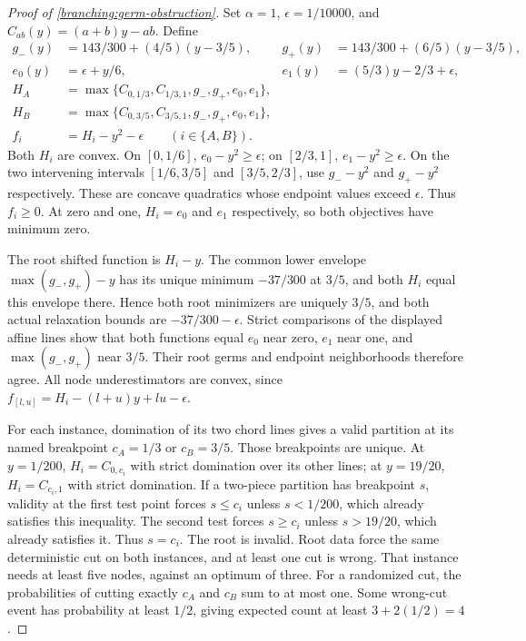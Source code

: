 \begin{proof}[Proof of \cref{branching:germ-obstruction}]
Set $\alpha=1$, $\epsilon=1/10000$, and
$C_{ab}(y)=(a+b)y-ab$. Define
\begin{align*}
 g_-(y)&=143/300+(4/5)(y-3/5),&
 g_+(y)&=143/300+(6/5)(y-3/5),\\
 e_0(y)&=\epsilon+y/6,&
 e_1(y)&=(5/3)y-2/3+\epsilon,\\
 H_A&=\max\{C_{0,1/3},C_{1/3,1},g_-,g_+,e_0,e_1\},\\
 H_B&=\max\{C_{0,3/5},C_{3/5,1},g_-,g_+,e_0,e_1\},\\
 f_i&=H_i-y^2-\epsilon\qquad(i\in\{A,B\}).
\end{align*}
Both $H_i$ are convex. On $[0,1/6]$, $e_0-y^2\ge\epsilon$;
on $[2/3,1]$, $e_1-y^2\ge\epsilon$. On the two intervening intervals
$[1/6,3/5]$ and $[3/5,2/3]$, use $g_--y^2$ and $g_+-y^2$
respectively. These are concave quadratics whose endpoint values exceed
$\epsilon$. Thus $f_i\ge0$. At zero and one, $H_i=e_0$ and $e_1$
respectively, so both objectives have minimum zero.

The root shifted function is $H_i-y$. The common lower envelope
$\max(g_-,g_+)-y$ has its unique minimum $-37/300$ at $3/5$,
and both $H_i$ equal this envelope there. Hence both root minimizers
are uniquely $3/5$, and both actual relaxation bounds are
$-37/300-\epsilon$. Strict comparisons of the displayed affine lines
show that both functions equal $e_0$ near zero, $e_1$ near one,
and $\max(g_-,g_+)$ near $3/5$. Their root germs and endpoint
neighborhoods therefore agree. All node underestimators are convex,
since $f_{[l,u]}=H_i-(l+u)y+lu-\epsilon$.

For each instance, domination of its two chord lines gives a valid
partition at its named breakpoint $c_A=1/3$ or $c_B=3/5$.
Those breakpoints are unique. At $y=1/200$, $H_i=C_{0,c_i}$
with strict domination over its other lines; at $y=19/20$,
$H_i=C_{c_i,1}$ with strict domination. If a two-piece partition
has breakpoint $s$, validity at the first test point forces $s\le c_i$
unless $s<1/200$, which already satisfies this inequality. The second
test forces $s\ge c_i$ unless $s>19/20$, which already satisfies it.
Thus $s=c_i$. The root is invalid. Root data force the same deterministic
cut on both instances, and at least one cut is wrong. That instance
needs at least five nodes, against an optimum of three. For a randomized
cut, the probabilities of cutting exactly $c_A$ and $c_B$ sum to at
most one. Some wrong-cut event has probability at least $1/2$, giving
expected count at least $3+2(1/2)=4$.


\end{proof}
